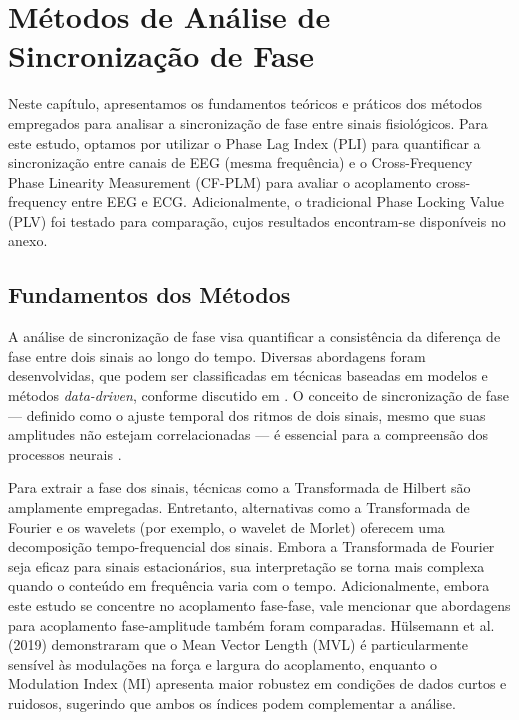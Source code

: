 \chapter{Métodos de Análise de Sincronização de Fase}
\label{chap:6_metodos_de_analise_de_sincronizacao_de_fase}

Neste capítulo, apresentamos os fundamentos teóricos e práticos dos métodos empregados para analisar a sincronização de fase entre sinais fisiológicos. Para este estudo, optamos por utilizar o Phase Lag Index (PLI) para quantificar a sincronização entre canais de EEG (mesma frequência) e o Cross-Frequency Phase Linearity Measurement (CF-PLM) para avaliar o acoplamento cross-frequency entre EEG e ECG. Adicionalmente, o tradicional Phase Locking Value (PLV) foi testado para comparação, cujos resultados encontram-se disponíveis no anexo.

\section{Fundamentos dos Métodos}

A análise de sincronização de fase visa quantificar a consistência da diferença de fase entre dois sinais ao longo do tempo. Diversas abordagens foram desenvolvidas, que podem ser classificadas em técnicas baseadas em modelos e métodos \textit{data-driven}, conforme discutido em \cite{seraj2018cerebral}. O conceito de sincronização de fase --- definido como o ajuste temporal dos ritmos de dois sinais, mesmo que suas amplitudes não estejam correlacionadas --- é essencial para a compreensão dos processos neurais \cite{seraj2018cerebral}.

Para extrair a fase dos sinais, técnicas como a Transformada de Hilbert são amplamente empregadas. Entretanto, alternativas como a Transformada de Fourier e os wavelets (por exemplo, o wavelet de Morlet) oferecem uma decomposição tempo-frequencial dos sinais. Embora a Transformada de Fourier seja eficaz para sinais estacionários, sua interpretação se torna mais complexa quando o conteúdo em frequência varia com o tempo\textsuperscript{\cite{singh2024evaluating}}. Adicionalmente, embora este estudo se concentre no acoplamento fase-fase, vale mencionar que abordagens para acoplamento fase-amplitude também foram comparadas. Hülsemann et al. (2019) \cite{hulsemann2019quantification} demonstraram que o Mean Vector Length (MVL) é particularmente sensível às modulações na força e largura do acoplamento, enquanto o Modulation Index (MI) apresenta maior robustez em condições de dados curtos e ruidosos, sugerindo que ambos os índices podem complementar a análise.

